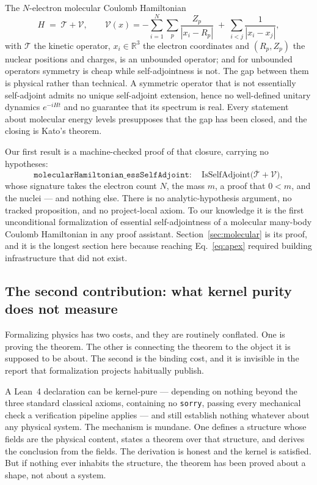 \documentclass[aps,prd,reprint,nofootinbib,superscriptaddress]{revtex4-2}
\newcommand{\thm}[1]{\texttt{#1}}   %
\newcommand{\Lean}{Lean~4}
\begin{document}
The $N$-electron molecular Coulomb Hamiltonian
\begin{equation}
H \;=\; \mathcal{T} + \mathcal{V},
\qquad
\mathcal{V}(x) = -\sum_{i=1}^{N}\sum_{p}\frac{Z_{p}}{|x_{i}-R_{p}|}
\;+\; \sum_{i<j}\frac{1}{|x_{i}-x_{j}|},
\label{eq:molecular-H}
\end{equation}
with $\mathcal{T}$ the kinetic operator, $x_{i}\in\mathbb{R}^{3}$ the electron coordinates and
$(R_{p},Z_{p})$ the nuclear positions and charges, is an unbounded operator; and for unbounded
operators symmetry is cheap while self-adjointness is not. The gap between them is physical rather
than technical. A symmetric operator that is not essentially self-adjoint admits no unique
self-adjoint extension, hence no well-defined unitary dynamics $e^{-iHt}$ and no guarantee that its
spectrum is real. Every statement about molecular energy levels presupposes that the gap has been
closed, and the closing is Kato's theorem.

Our first result is a machine-checked proof of that closure, carrying no hypotheses:
\begin{equation}
\thm{molecularHamiltonian\_essSelfAdjoint} :
\quad \mathrm{IsSelfAdjoint}\bigl(\overline{\mathcal{T}} + \mathcal{V}\bigr),
\label{eq:apex}
\end{equation}
whose signature takes the electron count $N$, the mass $m$, a proof that $0<m$, and the nuclei ---
and nothing else. There is no analytic-hypothesis argument, no tracked proposition, and no
project-local axiom. To our knowledge it is the first unconditional formalization of essential
self-adjointness of a molecular many-body Coulomb Hamiltonian in any proof assistant.
Section~\ref{sec:molecular} is its proof, and it is the longest section here because reaching
Eq.~\eqref{eq:apex} required building infrastructure that did not exist.

\subsection{The second contribution: what kernel purity does not measure}
\label{sec:inhabitance-thesis}

Formalizing physics has two costs, and they are routinely conflated. One is proving the theorem. The
other is connecting the theorem to the object it is supposed to be about. The second is the binding
cost, and it is invisible in the report that formalization projects habitually publish.

A \Lean{} declaration can be kernel-pure --- depending on nothing beyond the three standard classical
axioms, containing no \texttt{sorry}, passing every mechanical check a verification pipeline applies
--- and still establish nothing whatever about any physical system. The mechanism is mundane. One
defines a structure whose fields are the physical content, states a theorem over that structure, and
derives the conclusion from the fields. The derivation is honest and the kernel is satisfied. But if
nothing ever inhabits the structure, the theorem has been proved about a shape, not about a system.
\end{document}
